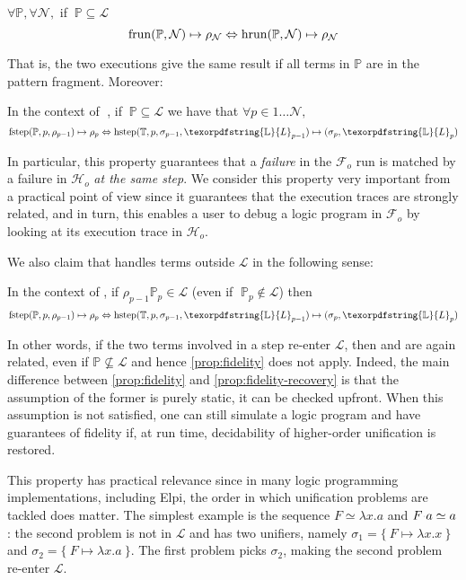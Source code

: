 \documentclass[sigconf,natbib=false,review]{acmart}
\newcommand{\appsep}{\ensuremath{\textcolor{lightgray}{\cdot}}}
\newcommand{\UnifRel}{\ensuremath{\simeq}}
\newcommand{\llambda}{\ensuremath{\mathcal{L}}\xspace}
\newcommand{\Fo}{\texorpdfstring{\ensuremath{\mathcal{F}_{\!o}\xspace}}{Fo}} %
\newcommand{\Ho}{\texorpdfstring{\ensuremath{\mathcal{H}_o}\xspace}{Ho}}
\newcommand{\linkStore}{\texorpdfstring{\ensuremath{\mathbb{L}}\xspace}{L}}
\newcommand{\foUnifPb}{\ensuremath{\mathbb{P}}\xspace}
\newcommand{\hoUnifPb}{\ensuremath{\mathbb{T}}\xspace}
\begin{document}
\begin{proposition}[Simulation]\label{prop:simulation}
$\forall \foUnifPb, \forall \mathcal{N},$ if $~\foUnifPb \subseteq \llambda$
$$
  \runF{\foUnifPb}{\mathcal{N}}{\rho}
  \Leftrightarrow
  \runH{\foUnifPb}{\mathcal{N}}{\rho}
$$
\end{proposition}

\noindent
That is, the two executions give the same result if all terms in
\foUnifPb are in the pattern fragment. Moreover:

\begin{proposition}\label{prop:fidelity}
In the context of$\;$ \hrun, if $~\foUnifPb \subseteq \llambda$ we have that
$\forall p \in 1 \ldots \mathcal{N},$
$$
\stepF{\foUnifPb}{p}{\rho_{p-1}}{\rho_p}
\Leftrightarrow
\stepH{\hoUnifPb}{p}{\sigma_{p-1}}{\linkStore_{p-1}}{\sigma_p}{\linkStore_p}
$$
\end{proposition}
\noindent
In particular, this property guarantees that a \emph{failure} in the \Fo{} run
is matched by a failure in \Ho{} \emph{at the same step}. We consider this
property very important from a practical point of view since it guarantees
that the execution traces are strongly related, and in turn, this enables a user
to debug a logic program in \Fo{} by looking at its execution trace in
\Ho{}.

We also claim that \hrun handles terms outside \llambda in the following sense:

\begin{proposition}\label{prop:fidelity-recovery} 
In the context of \hrun, if 
$\rho_{p-1} \foUnifPb_{p} \in \llambda$ 
(even if $\;\foUnifPb_{p} \not\in \llambda$)
then
$$
\stepF{\foUnifPb}{p}{\rho_{p-1}}{\rho_p} \Leftrightarrow
\stepH{\hoUnifPb}{p}{\sigma_{p-1}}{\linkStore_{p-1}}{\sigma_{p}}{\linkStore_p}
$$
\end{proposition}
  
In other words, if the two terms involved in a step
re-enter \llambda, then \hstep and \fstep are again related, even if
$\foUnifPb \not\subseteq \llambda$ and hence \cref{prop:fidelity} does not apply.
Indeed, the main difference between \cref{prop:fidelity} and \cref{prop:fidelity-recovery}
is that the assumption of the former is purely static, it can be checked upfront. 
When this assumption is not satisfied, one can still simulate a logic program and
have guarantees of fidelity if, at run time, decidability of higher-order
unification is restored.

This property has practical relevance since in many logic programming
implementations, including Elpi, the order in which unification problems
are tackled does matter.
The simplest example is the sequence $F \UnifRel \lambda x.a$ and
$F \appsep a \UnifRel a$: the second problem is not in \llambda and has two
unifiers, namely $\sigma_1 = \{~ F \mapsto \lambda x.x ~\}$ and
$\sigma_2 = \{~ F \mapsto \lambda x.a ~\}$. The first problem picks $\sigma_2$,
making the second problem re-enter \llambda.
\end{document}
